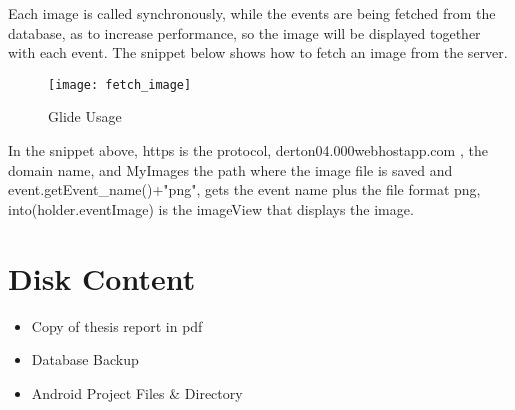 \begin{appendices}
Each image is called synchronously, while the events are being fetched from the database, as to increase performance, so the image will be displayed together with each event.
The snippet below shows how to fetch an image from the server.
\begin{figure}[h!]
	\centering       
	\texttt{[image: fetch\_image]}
	\caption{Glide Usage}
	\label{fig:glide_usage}	
\end{figure}
In the snippet above, https is the protocol, derton04.000webhostapp.com , the domain name, and MyImages the path where the image file is saved and event.getEvent\_name()+"png", gets the event name plus the file format png, into(holder.eventImage) is the imageView that displays the image.









\section{Disk Content}
\begin{itemize}
	\item Copy of thesis report in pdf
	\item Database Backup
	\item Android Project Files \& Directory
\end{itemize}



\end{appendices}